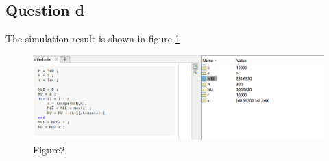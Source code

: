 \documentclass[12pt,letterpaper]{article}
\begin{document}
\subsection*{Question d}
The simulation result is shown in figure \ref{fg2} 
\begin{center}
\begin{figure}
  \centering
  \includegraphics[width=15cm]{002.png}
  \caption{Figure2}\label{fg2}
\end{figure}
\end{center}
\end{document}
